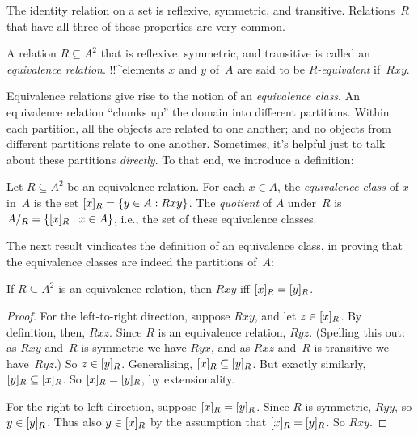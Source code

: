 \documentclass[../../../include/open-logic-section]{subfiles}
\begin{document}


The identity relation on a set is reflexive, symmetric, and
transitive. Relations~$R$ that have all three of these properties are very
common.

\begin{defn} 
A relation $R \subseteq A^2$ that is reflexive, symmetric, and
transitive is called an \emph{equivalence relation}. !!^{element}s $x$
and $y$ of~$A$ are said to be \emph{$R$-equivalent} if~$Rxy$.
\end{defn}

Equivalence relations give rise to the notion of an \emph{equivalence
class}. An equivalence relation ``chunks up'' the domain into
different partitions. Within each partition, all the objects are
related to one another; and no objects from different partitions
relate to one another. Sometimes, it's helpful just to talk about
these partitions \emph{directly}. To that end, we introduce a
definition:

\begin{defn}
Let $R \subseteq A^2$ be an equivalence relation. For each $x \in A$,
the \emph{equivalence class} of $x$ in~$A$ is the set $[x]_{R}
= \{ y \in A : Rxy \}$. The \emph{quotient} of $A$ under~$R$ is
$A/{_{R}} = \{ [x]_{R} : x \in A \}$, i.e., the set
of these equivalence classes. 
\end{defn}

The next result vindicates the definition of an equivalence class, in
proving that the equivalence classes are indeed the partitions of~$A$:

\begin{prop}
If $R \subseteq A^2$ is an equivalence relation, then $Rxy$ iff
$[x]_{R} = [y]_{R}$.
\end{prop}

\begin{proof}
For the left-to-right direction, suppose $Rxy$, and let $z \in
[x]_{R}$. By definition, then, $Rxz$. Since $R$ is an
equivalence relation, $Ryz$. (Spelling this out: as $Rxy$ and~$R$ is
symmetric we have $Ryx$, and as $Rxz$ and~$R$ is transitive we
have~$Ryz$.) So $z \in [y]_{R}$. Generalising,
$[x]_{R} \subseteq [y]_{R}$. But exactly similarly,
$[y]_{R} \subseteq [x]_{R}$. So $[x]_{R} =
[y]_{R}$, by extensionality.

For the right-to-left direction, suppose $[x]_{R} =
[y]_{R}$. Since $R$ is symmetric, $Ryy$, so $y \in
[y]_{R}$. Thus also $y \in [x]_{R}$ by the assumption
that $[x]_{R} = [y]_{R}$. So $Rxy$.
\end{proof}
\end{document}
